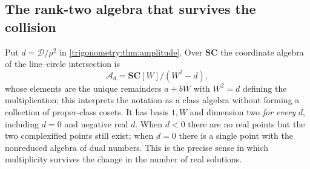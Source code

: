 \documentclass[11pt,letterpaper]{article}
\numberwithin{equation}{section}
\theoremstyle{definition}
\theoremstyle{remark}
\newcommand{\SC}{\mathbf{SC}}
\begin{document}
\subsection{The rank-two algebra that survives the collision}
Put $d=\mathcal D/\rho^2$ in \cref{trigonometry:thm:amplitude}. Over $\SC$ the coordinate algebra
of the line--circle intersection is
\begin{equation}\label{trigonometry:eq:quadalgebra}
 \mathcal A_d=\SC[W]/(W^2-d),
\end{equation}
whose elements are the unique remainders $a+bW$ with $W^2=d$ defining the multiplication; this
interprets the notation as a class algebra without forming a collection of proper-class cosets. It
has basis $1,W$ and dimension two \emph{for every} $d$, including $d=0$ and negative real $d$.
When $d<0$ there are no real points but the two complexified points still exist; when $d=0$ there
is a single point with the nonreduced algebra of dual numbers. This is the precise sense in which
multiplicity survives the change in the number of real solutions.
\end{document}

